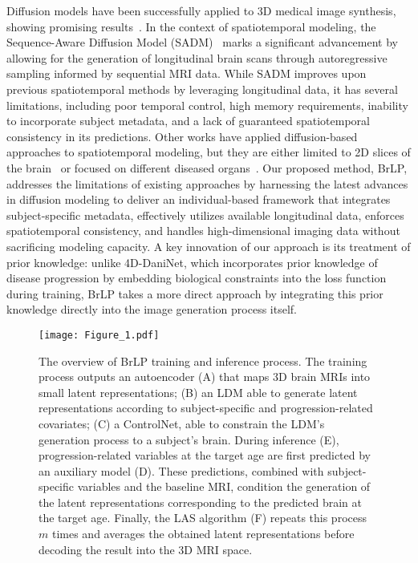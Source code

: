 Diffusion models have been successfully applied to 3D medical image synthesis, showing promising results~\citep{pinaya2022brain}. In the context of spatiotemporal modeling, the Sequence-Aware Diffusion Model (SADM)~\citep{yoon2023sadm} marks a significant advancement by allowing for the generation of longitudinal brain scans through autoregressive sampling informed by sequential MRI data. While SADM improves upon previous spatiotemporal methods by leveraging longitudinal data, it has several limitations, including poor temporal control, high memory requirements, inability to incorporate subject metadata, and a lack of guaranteed spatiotemporal consistency in its predictions. Other works have applied diffusion-based approaches to spatiotemporal modeling, but they are either limited to 2D slices of the brain~\citep{litrico2024tadm} or focused on different diseased organs~\citep{kim2022diffusion}. Our proposed method, BrLP, addresses the limitations of existing approaches by harnessing the latest advances in diffusion modeling to deliver an individual-based framework that integrates subject-specific metadata, effectively utilizes available longitudinal data, enforces spatiotemporal consistency, and handles high-dimensional imaging data without sacrificing modeling capacity. A key innovation of our approach is its treatment of prior knowledge: unlike 4D-DaniNet, which incorporates prior knowledge of disease progression by embedding biological constraints into the loss function during training, BrLP takes a more direct approach by integrating this prior knowledge directly into the image generation process itself.


\begin{figure*}[t!]
    \centering
    \texttt{[image: Figure\_1.pdf]}
    \caption{The overview of BrLP training and inference process. The training process outputs an autoencoder (A) that maps 3D brain MRIs into small latent representations; (B) an LDM able to generate latent representations according to subject-specific and progression-related covariates; (C) a ControlNet, able to constrain the LDM’s generation process to a subject’s brain. During inference (E), progression-related variables at the target age are first predicted by an auxiliary model (D). These predictions, combined with subject-specific variables and the baseline MRI, condition the generation of the latent representations corresponding to the predicted brain at the target age. Finally, the LAS algorithm (F) repeats this process $m$ times and averages the obtained latent representations before decoding the result into the 3D MRI space.}
    \label{fig:pipeline}
\end{figure*}